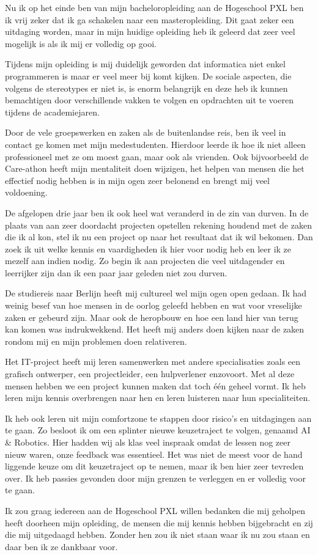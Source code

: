 Nu ik op het einde ben van mijn bacheloropleiding aan de Hogeschool PXL ben ik vrij zeker dat ik ga schakelen naar een masteropleiding. Dit gaat zeker een uitdaging worden, maar in mijn huidige opleiding heb ik geleerd dat zeer veel mogelijk is als ik mij er volledig op gooi.

Tijdens mijn opleiding is mij duidelijk geworden dat informatica niet enkel programmeren is maar er veel meer bij komt kijken. De sociale aspecten, die volgens de stereotypes er niet is, is enorm belangrijk en deze heb ik kunnen bemachtigen door verschillende vakken te volgen en opdrachten uit te voeren tijdens de academiejaren.

Door de vele groepswerken en zaken als de buitenlandse reis, ben ik veel in contact ge komen met mijn medestudenten. Hierdoor leerde ik hoe ik niet alleen professioneel met ze om moest gaan, maar ook als vrienden. Ook bijvoorbeeld de Care\hyp{}athon heeft mijn mentaliteit doen wijzigen, het helpen van mensen die het effectief nodig hebben is in mijn ogen zeer belonend en brengt mij veel voldoening.

De afgelopen drie jaar ben ik ook heel wat veranderd in de zin van durven. In de plaats van aan zeer doordacht projecten opstellen rekening houdend met de zaken die ik al kon, stel ik nu een project op naar het resultaat dat ik wil bekomen. Dan zoek ik uit welke kennis en vaardigheden ik hier voor nodig heb en leer ik ze mezelf aan indien nodig. Zo begin ik aan projecten die veel uitdagender en leerrijker zijn dan ik een paar jaar geleden niet zou durven.

De studiereis naar Berlijn heeft mij cultureel wel mijn ogen open gedaan. Ik had weinig besef van hoe mensen in de oorlog geleefd hebben en wat voor vreselijke zaken er gebeurd zijn. Maar ook de heropbouw en hoe een land hier van terug kan komen was indrukwekkend. Het heeft mij anders doen kijken naar de zaken rondom mij en mijn problemen doen relativeren.

Het IT\hyp{}project heeft mij leren samenwerken met andere specialisaties zoals een grafisch ontwerper, een projectleider, een hulpverlener enzovoort. Met al deze mensen hebben we een project kunnen maken dat toch één geheel vormt. Ik heb leren mijn kennis overbrengen naar hen en leren luisteren naar hun specialiteiten.

Ik heb ook leren uit mijn comfortzone te stappen door risico’s en uitdagingen aan te gaan. Zo besloot ik om een splinter nieuwe keuzetraject te volgen, genaamd AI \& Robotics. Hier hadden wij als klas veel inspraak omdat de lessen nog zeer nieuw waren, onze feedback was essentieel. Het was niet de meest voor de hand liggende keuze om dit keuzetraject op te nemen, maar ik ben hier zeer tevreden over. Ik heb passies gevonden door mijn grenzen te verleggen en er volledig voor te gaan.

Ik zou graag iedereen aan de Hogeschool PXL willen bedanken die mij geholpen heeft doorheen mijn opleiding, de mensen die mij kennis hebben bijgebracht en zij die mij uitgedaagd hebben. Zonder hen zou ik niet staan waar ik nu zou staan en daar ben ik ze dankbaar voor.